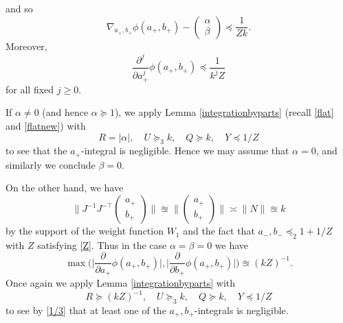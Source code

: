\documentclass[11pt]{amsart}
\numberwithin{equation}{section}
\theoremstyle{plain}
\theoremstyle{definition}
\renewcommand{\geq}{\geqslant}
\numberwithin{equation}{section}
\begin{document}
and so 
\[ \nabla_{a_+, b_+} \phi(a_+, b_+) - \left(\begin{matrix}\alpha\\ \beta\end{matrix}\right)  \preccurlyeq \frac{1}{Zk}. \]
Moreover, 
%
 $$\frac{\partial^j}{\partial a^j_+} \phi(a_+, b_+) \preccurlyeq \frac{1}{k^j Z}$$
 for all fixed $j \geq 0$. 
 
  If $\alpha \not= 0$ (and hence $\alpha \succcurlyeq 1$), we apply Lemma \ref{integrationbyparts} (recall \eqref{flat} and \eqref{flatnew}) with
 $$R = |\alpha|, \quad  U \succcurlyeq_{3} k, \quad  Q \succcurlyeq k, \quad Y \preccurlyeq 1/Z$$
 to see that the $a_+$-integral is negligible.  Hence we may assume that $\alpha = 0$, and similarly we conclude $\beta = 0$. %

On the other hand, we have
$$%
\Big \| J^{-1} J^{-\top}\left(\begin{matrix}    a_+ \\ b_+  \end{matrix}\right) \Big \| \approxeq \Big\| \left(\begin{matrix}    a_+ \\ b_+  \end{matrix}\right) \Big\|  \asymp  \| N \| \approxeq k  $$
by the support of the weight function $W_1$ and the fact that $a_-, b_- \preccurlyeq_{2} 1+ 1/Z$ with $Z$ satisfying \eqref{Z}. 
Thus in the case $\alpha = \beta = 0$ we have
$$\max\Big( \Big| \frac{\partial}{\partial a_+} \phi(a_+, b_+)\Big|,  \Big| \frac{\partial}{\partial b_+} \phi(a_+, b_+)\Big| \Big) \approxeq (kZ)^{-1} .$$
Once again we apply Lemma \ref{integrationbyparts} with
 $$R\succcurlyeq (kZ)^{-1}, \quad U \succcurlyeq_{3} k, \quad  Q \succcurlyeq k, \quad Y \preccurlyeq 1/Z$$
 to see by \eqref{1/3} that at least one of the $a_+, b_+$-integrals is negligible. 
 
\end{document}
